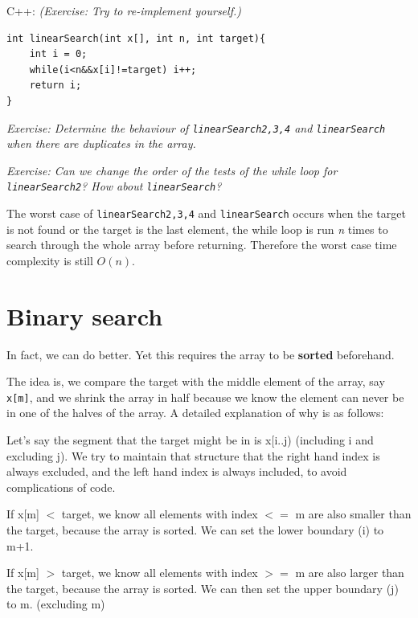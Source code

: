 C++: \textit{(Exercise:  Try to re-implement yourself.)}
\begin{lstlisting} 
int linearSearch(int x[], int n, int target){
    int i = 0;
    while(i<n&&x[i]!=target) i++;
    return i;
}
\end{lstlisting}

\textit{Exercise: Determine the behaviour of \texttt{linearSearch2,3,4} and \texttt{linearSearch} when there are duplicates in the array.}

\vspace{6mm}

\textit{Exercise: Can we change the order of the tests of the while loop for \texttt{linearSearch2}? How about \texttt{linearSearch}?}
\vspace{6mm}

The worst case of \texttt{linearSearch2,3,4} and \texttt{linearSearch} occurs when the target is not found or the target is the last element, the while loop is run \textit{n} times to search through the whole array before returning. Therefore the worst case time complexity is still $O(n)$.


\pagebreak

\section{Binary search}

In fact, we can do better. Yet this requires the array to be \textbf{sorted} beforehand.

The idea is, we compare the target with the middle element of the array, say \texttt{x[m]}, and we shrink the array in half because we know the element can never be in one of the halves of the array. A detailed explanation of why is as follows:
\vspace{6mm}

Let's say the segment that the target might be in is x[i..j) (including i and excluding j). We try to maintain that structure that the right hand index is always excluded, and the left hand index is always included, to avoid complications of code.
\vspace{6mm}

If x[m] $<$ target, we know all elements with index $<=$ m are also smaller than the target, because the array is sorted. We can set the lower boundary (i) to m+1.

If x[m] $>$ target, we know all elements with index $>=$ m are also larger than the target, because the array is sorted. We can then set the upper boundary (j) to m. (excluding m)
\vspace{6mm}

